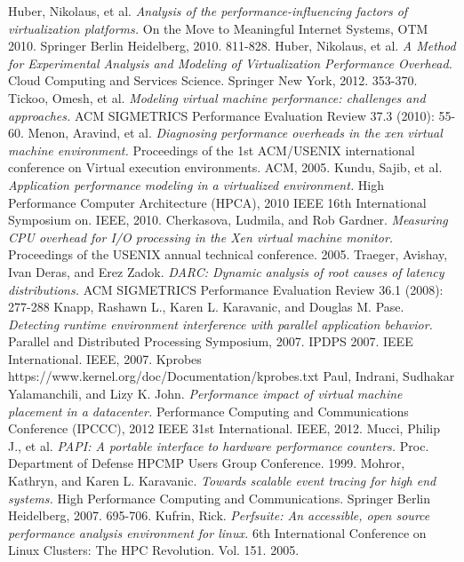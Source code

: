 \begin{thebibliography}{9}
Huber, Nikolaus, et al. \emph{Analysis of the performance-influencing factors of virtualization platforms.}  On the Move to Meaningful Internet Systems, OTM 2010. Springer Berlin Heidelberg, 2010. 811-828.
Huber, Nikolaus, et al. \emph{A Method for Experimental Analysis and Modeling of Virtualization Performance Overhead.}  Cloud Computing and Services Science. Springer New York, 2012. 353-370.
Tickoo, Omesh, et al.  \emph{Modeling virtual machine performance: challenges and approaches.}  ACM SIGMETRICS Performance Evaluation Review 37.3 (2010): 55-60.
 Menon, Aravind, et al.  \emph{Diagnosing performance overheads in the xen virtual machine environment.}  Proceedings of the 1st ACM/USENIX international conference on Virtual execution environments. ACM, 2005.
Kundu, Sajib, et al.  \emph{Application performance modeling in a virtualized environment.}  High Performance Computer Architecture (HPCA), 2010 IEEE 16th International Symposium on. IEEE, 2010.
Cherkasova, Ludmila, and Rob Gardner.  \emph{Measuring CPU overhead for I/O processing in the Xen virtual machine monitor.}  Proceedings of the USENIX annual technical conference. 2005.
Traeger, Avishay, Ivan Deras, and Erez Zadok.  \emph{DARC: Dynamic analysis of root causes of latency distributions.}  ACM SIGMETRICS Performance Evaluation Review 36.1 (2008): 277-288
Knapp, Rashawn L., Karen L. Karavanic, and Douglas M. Pase.  \emph{Detecting runtime environment interference with parallel application behavior.}  Parallel and Distributed Processing Symposium, 2007. IPDPS 2007. IEEE International. IEEE, 2007.
Kprobes   https://www.kernel.org/doc/Documentation/kprobes.txt
Paul, Indrani, Sudhakar Yalamanchili, and Lizy K. John.  \emph{Performance impact of virtual machine placement in a datacenter.}  Performance Computing and Communications Conference (IPCCC), 2012 IEEE 31st International. IEEE, 2012.
Mucci, Philip J., et al.  \emph{PAPI: A portable interface to hardware performance counters.}  Proc. Department of Defense HPCMP Users Group Conference. 1999.
Mohror, Kathryn, and Karen L. Karavanic.  \emph{Towards scalable event tracing for high end systems.}  High Performance Computing and Communications. Springer Berlin Heidelberg, 2007. 695-706.
Kufrin, Rick.  \emph{Perfsuite: An accessible, open source performance analysis environment for linux.}  6th International Conference on Linux Clusters: The HPC Revolution. Vol. 151. 2005.

\end{thebibliography}
